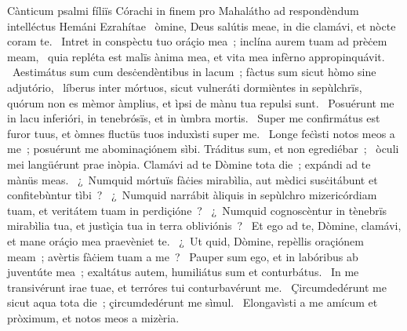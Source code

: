 { Cànticum psalmi fíliïs Córachi in finem pro Mahalátho ad respondèndum intelléctus Hemáni Ezrahítae}
{%
~òmine, Deus salútis meae, in die clamávi, et nòcte coram te. 
~Intret in conspèctu tuo oráçio mea~; inclína aurem tuam ad prèċem meam, 
~quia repléta est malïs ànima mea, et vita mea infèrno appropinquávit. 
~Aestimátus sum cum desċendèntibus in lacum~; fàctus sum sicut hòmo sine adjutório, 
~líberus inter mórtuos, sicut vulneráti dormièntes in sepùlchrïs, quórum non es mèmor àmplius, et ìpsi de mànu tua repulsi sunt. 
~Posuérunt me in lacu inferióri, in tenebrósïs, et in ùmbra mortis. 
~Super me confirmátus est furor tuus, et òmnes fluctüs tuos induxìsti super me. 
~Longe feċìsti notos meos a me~; posuérunt me abominaçiónem sìbi. Tráditus sum, et non egrediébar~; 
~òculi mei langüérunt prae inòpia. Clamávi ad te Dòmine tota die~; expándi ad te mànüs meas. 
~¿~Numquid mórtuïs fàċies mirabìlia, aut mèdici susċitábunt et confitebùntur tìbi~? 
~¿~Numquid narrábit àliquis in sepùlchro mizericórdiam tuam, et veritátem tuam in perdiçióne~? 
~¿~Numquid cognoscèntur in tènebrïs mirabìlia tua, et justìçia tua in terra obliviónis~? 
~Et ego ad te, Dòmine, clamávi, et mane oráçio mea praevèniet te. 
~¿~Ut quid, Dòmine, repèllis oraçiónem meam~; avèrtis fàċiem tuam a me~? 
~Pauper sum ego, et in labóribus ab juventúte mea~; exaltátus autem, humiliátus sum et conturbátus. 
~In me transivérunt irae tuae, et terróres tui conturbavérunt me. 
~Çircumdedérunt me sicut aqua tota die~; çircumdedérunt me sìmul. 
~Elongavìsti a me amícum et pròximum, et notos meos a mizèria. 
}
